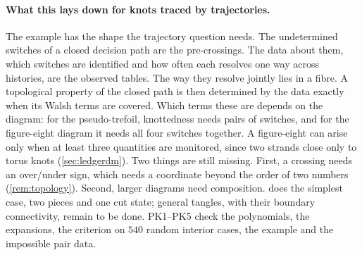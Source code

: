 \documentclass[11pt]{article}
\theoremstyle{definition}\newtheorem{definition}[theorem]{Definition}\newtheorem{remark}[theorem]{Remark}\newtheorem{example}[theorem]{Example}\newtheorem{problem}[theorem]{Open problem}\crefname{problem}{Problem}{Problems}
\begin{document}
\paragraph{What this lays down for knots traced by trajectories.} The example has the shape the trajectory question needs. The undetermined switches of a closed decision path are the pre-crossings. The data about them, which switches are identified and how often each resolves one way across histories, are the observed tables. The way they resolve jointly lies in a fibre. A topological property of the closed path is then determined by the data exactly when its Walsh terms are covered. Which terms these are depends on the diagram: for the pseudo-trefoil, knottedness needs pairs of switches, and for the figure-eight diagram it needs all four switches together. A figure-eight can arise only when at least three quantities are monitored, since two strands close only to torus knots (\cref{sec:ledgerdm}). Two things are still missing. First, a crossing needs an over/under sign, which needs a coordinate beyond the order of two numbers (\cref{rem:topology}). Second, larger diagrams need composition.  does the simplest case, two pieces and one cut state; general tangles, with their boundary connectivity, remain to be done. PK1--PK5 check the polynomials, the expansions, the criterion on $540$ random interior cases, the example and the impossible pair data.
\end{document}
